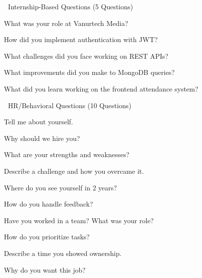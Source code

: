 📆 Internship-Based Questions (5 Questions)

What was your role at Vanurtech Media?

How did you implement authentication with JWT?

What challenges did you face working on REST APIs?

What improvements did you make to MongoDB queries?

What did you learn working on the frontend attendance system?

💬 HR/Behavioral Questions (10 Questions)

Tell me about yourself.

Why should we hire you?

What are your strengths and weaknesses?

Describe a challenge and how you overcame it.

Where do you see yourself in 2 years?

How do you handle feedback?

Have you worked in a team? What was your role?

How do you prioritize tasks?

Describe a time you showed ownership.

Why do you want this job?